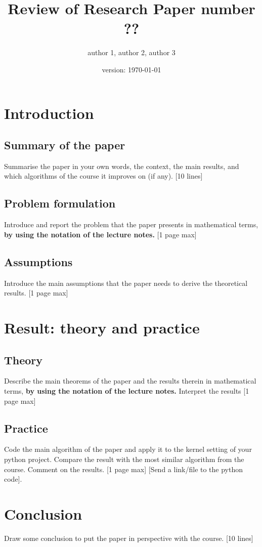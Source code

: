 \documentclass[10pt,english]{article}
\title{Review of Research Paper number ??}
\date{version: \today}%
\author{author 1, author 2, author 3}
\begin{document}
\maketitle

\section{Introduction}

\subsection{Summary of the paper}

Summarise the paper in your own words, the context, the main results, and which algorithms of the course it improves on (if any). [10 lines] 

\subsection{Problem formulation}

Introduce and report the problem that the paper presents in mathematical terms, {\bf by using the notation of the lecture notes.} [1 page max]

\subsection{Assumptions}

Introduce the main assumptions that the paper needs to derive the theoretical results. [1 page max]

\section{Result: theory and practice}

\subsection{Theory}

Describe the main theorems of the paper and the results therein in mathematical terms, {\bf by using the notation of the lecture notes.} Interpret the results [1 page max]

\subsection{Practice}

Code the main algorithm of the paper and apply it to the kernel setting of your python project. Compare the result with the most similar algorithm from the course. Comment on the results. [1 page max] [Send a link/file to the python code].

\section{Conclusion}

Draw some conclusion to put the paper in perspective with the course. [10 lines]
\end{document}
